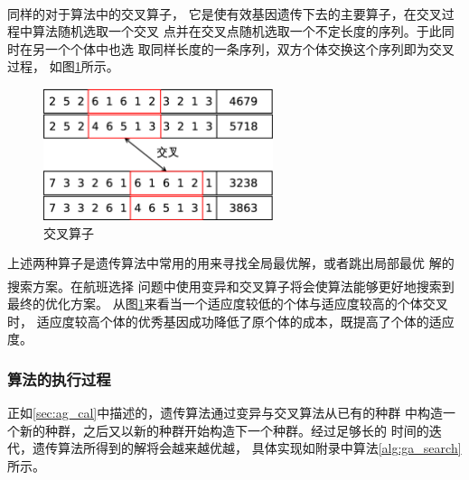 \documentclass[fontset=fandol,a4paper,zihao=5]{ctexart}
\newcommand{\upcite}[1]{\textsuperscript{\textsuperscript{\cite{#1}}}}
\begin{document}
			同样的对于算法中的交叉算子\upcite{胡中功2008群智能算法的研究进展}，
            它是使有效基因遗传下去的主要算子，在交叉过程中算法随机选取一个交叉
            点并在交叉点随机选取一个不定长度的序列。于此同时在另一个个体中也选
            取同样长度的一条序列，双方个体交换这个序列即为交叉过程，
            如图\ref{fig:cross}所示。
			\begin{figure}[!htbp]
				\centering
				\includegraphics[width=0.6\textwidth]{pic/life_cross.eps}
				\caption{交叉算子}
				\label{fig:cross}
			\end{figure}
		
			上述两种算子是遗传算法中常用的用来寻找全局最优解，或者跳出局部最优
            解的搜索方案\upcite{苗夺谦1999知识约简的一种启发式算法}。在航班选择
            问题中使用变异和交叉算子将会使算法能够更好地搜索到最终的优化方案。
            从图\ref{fig:cross}来看当一个适应度较低的个体与适应度较高的个体交叉时，
            适应度较高个体的优秀基因成功降低了原个体的成本，既提高了个体的适应度。
			\subsubsection{算法的执行过程}
			正如\ref{sec:ag_cal}中描述的，遗传算法通过变异与交叉算法从已有的种群
            中构造一个新的种群，之后又以新的种群开始构造下一个种群。经过足够长的
            时间的迭代，遗传算法所得到的解将会越来越优越，
            具体实现如附录中算法\ref{alg:ga_search}所示。
		
\end{document}
